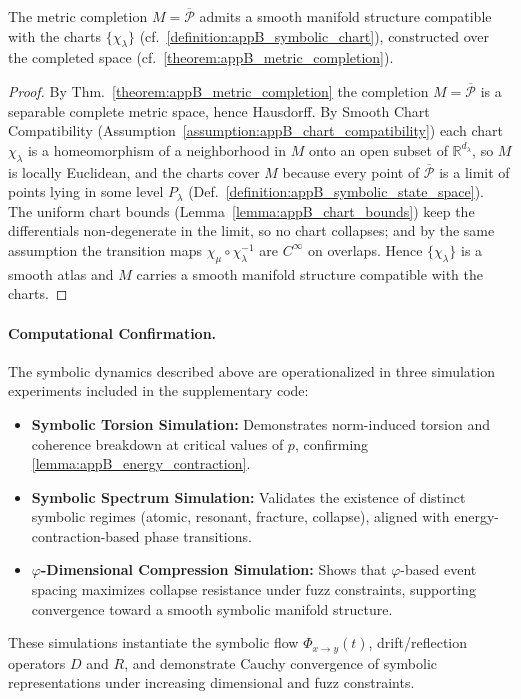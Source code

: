 \begin{theorem}
\label{theorem:appB_smooth_atlas}
The metric completion $M = \overline{\mathcal{P}}$ admits a smooth manifold structure compatible with the charts $\{\chi_\lambda\}$ (cf.~\ref{definition:appB_symbolic_chart}), constructed over the completed space (cf.~\ref{theorem:appB_metric_completion}).
\end{theorem}
\begin{proof}
\label{proof:appB_smooth_atlas}
\leavevmode
By Thm.~\ref{theorem:appB_metric_completion} the completion $M=\overline{\mathcal{P}}$ is a separable complete metric space, hence Hausdorff. By Smooth Chart Compatibility (Assumption~\ref{assumption:appB_chart_compatibility}) each chart $\chi_\lambda$ is a homeomorphism of a neighborhood in $M$ onto an open subset of $\mathbb{R}^{d_\lambda}$, so $M$ is locally Euclidean, and the charts cover $M$ because every point of $\overline{\mathcal{P}}$ is a limit of points lying in some level $P_\lambda$ (Def.~\ref{definition:appB_symbolic_state_space}). The uniform chart bounds (Lemma~\ref{lemma:appB_chart_bounds}) keep the differentials non-degenerate in the limit, so no chart collapses; and by the same assumption the transition maps $\chi_\mu\circ\chi_\lambda^{-1}$ are $C^\infty$ on overlaps. Hence $\{\chi_\lambda\}$ is a smooth atlas and $M$ carries a smooth manifold structure compatible with the charts.
\end{proof}

\paragraph{Computational Confirmation.}
The symbolic dynamics described above are operationalized in three simulation experiments included in the supplementary code:
\begin{itemize}
  \item \textbf{Symbolic Torsion Simulation:} Demonstrates norm-induced torsion and coherence breakdown at critical values of \( p \), confirming \autoref{lemma:appB_energy_contraction}.
  \item \textbf{Symbolic Spectrum Simulation:} Validates the existence of distinct symbolic regimes (atomic, resonant, fracture, collapse), aligned with energy-contraction-based phase transitions.
  \item \textbf{$\varphi$-Dimensional Compression Simulation:} Shows that $\varphi$-based event spacing maximizes collapse resistance under fuzz constraints, supporting convergence toward a smooth symbolic manifold structure.
\end{itemize}
These simulations instantiate the symbolic flow \( \Phi_{x \to y}(t) \), drift/reflection operators \( D \) and \( R \), and demonstrate Cauchy convergence of symbolic representations under increasing dimensional and fuzz constraints.


